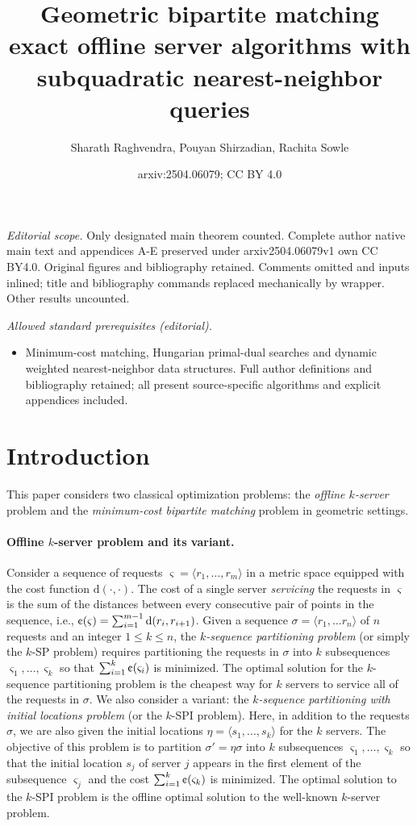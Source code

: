 \documentclass[11pt,onecolumn]{article}
\title{Geometric bipartite matching exact offline server algorithms with subquadratic nearest-neighbor queries}
\author{Sharath Raghvendra, Pouyan Shirzadian, Rachita Sowle}
\date{arxiv:2504.06079; CC BY 4.0}
\newcommand{\distance}[2]{\mathrm{d}(#1, #2)}
\newcommand{\requests}{\sigma}
\newcommand{\seqcost}{\text{\textcent}}
\newcommand\myparagraph[1]{\paragraph{#1}}
\begin{document}
\maketitle
\noindent\textit{Editorial scope.} Only designated main theorem counted. Complete author native main text and appendices A-E preserved under arxiv2504.06079v1 own CC BY4.0. Original figures and bibliography retained. Comments omitted and inputs inlined; title and bibliography commands replaced mechanically by wrapper. Other results uncounted.\par\medskip
\noindent\textit{Allowed standard prerequisites (editorial).}\begin{itemize}
\item Minimum-cost matching, Hungarian primal-dual searches and dynamic weighted nearest-neighbor data structures. Full author definitions and bibliography retained; all present source-specific algorithms and explicit appendices included.
\end{itemize}\medskip

\section{Introduction}\label{sec:introduction}


This paper considers two classical optimization problems: the \emph{offline $k$-server} problem and the \emph{minimum-cost bipartite matching} problem in geometric settings. 
%

 
\myparagraph{Offline $k$-server problem and its variant.} Consider a sequence of requests $\varsigma = \langle r_1,\ldots, r_m \rangle$ in a metric space equipped with the cost function $\distance{\cdot}{\cdot}$. The cost of a single server \emph{servicing} the requests in $\varsigma$ is the sum of the distances between every consecutive pair of points in the sequence, i.e.,  $\seqcost(\varsigma)=\sum_{i=1}^{m-1} \distance{r_i}{r_{i+1}}$. Given a sequence $\requests = \langle r_1,\ldots r_n\rangle$ of $n$ requests and an integer $1 \le k \le n$, the \emph{$k$-sequence partitioning problem} (or simply the $k$-SP problem) requires partitioning the requests in $\requests$ into $k$ subsequences $\varsigma_1, \ldots, \varsigma_k$ so that $\sum_{i=1}^{k}\seqcost(\varsigma_i)$ is minimized. The optimal solution for the $k$-sequence partitioning problem is the cheapest way for $k$ servers to service all of the requests in $\requests$. 
We also consider a variant: the \emph{$k$-sequence partitioning with initial locations problem} (or the $k$-SPI problem). Here,
 in addition to the requests $\requests$, we are also given the initial locations $\eta=\langle s_1,\ldots, s_k\rangle$ for the $k$ servers. The objective of this problem is to partition $\requests' = \eta \requests$ into $k$ subsequences $\varsigma_1,\ldots, \varsigma_k$ so that the initial location $s_j$ of server $j$ appears in the first element of the subsequence $\varsigma_j$ and the cost $\sum_{i=1}^{k}\seqcost(\varsigma_k)$ is minimized. 
The optimal solution to the $k$-SPI problem is the offline optimal solution to the well-known $k$-server problem. 
\end{document}
